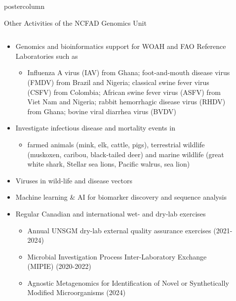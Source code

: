 \documentclass[final]{beamer}
\begin{document}
\begin{frame}
\begin{columns}
\begin{column}{.5\textwidth}
\begin{beamercolorbox}[center,wd=\textwidth]{postercolumn}
\begin{minipage}[T]{.95\textwidth}
{  %
  \begin{block}{Other Activities of the NCFAD Genomics Unit}
    \begin{columns}
      \begin{column}{0.7\textwidth}
        \begin{itemize}
          \item Genomics and bioinformatics support for WOAH and FAO Reference Laboratories such as
          \begin{itemize}
            \item Influenza A virus (IAV) from Ghana; foot-and-mouth disease virus (FMDV) from Brazil and Nigeria; classical swine fever virus (CSFV) from Colombia; African swine fever virus (ASFV) from Viet Nam and Nigeria; rabbit hemorrhagic disease virus (RHDV) from Ghana; bovine viral diarrhea virus (BVDV)
          \end{itemize}
          \item Investigate infectious disease and mortality events in
          \begin{itemize}
            \item farmed animals (mink, elk, cattle, pigs), terrestrial wildlife (muskoxen, caribou, black-tailed deer) and marine wildlife (great white shark, Stellar sea lions, Pacific walrus, sea lion)
          \end{itemize}
          \item Viruses in wild-life and disease vectors
          \item Machine learning \& AI for biomarker discovery and sequence analysis
          \item Regular Canadian and international wet- and dry-lab exercises
          \begin{itemize}
            \item Annual UNSGM dry-lab external quality assurance exercises (2021-2024)
            \item Microbial Investigation Process Inter-Laboratory Exchange (MIPIE) (2020-2022)
            \item Agnostic Metagenomics for Identification of Novel or Synthetically Modified Microorganisms (2024)
          \end{itemize}
        \end{itemize}
      \end{column}
      \begin{column}{0.3\textwidth}
        \begin{figure}

\end{figure}
\end{column}
\end{columns}
\end{block}}
\end{minipage}
\end{beamercolorbox}
\end{column}
\end{columns}
\end{frame}
\end{document}
